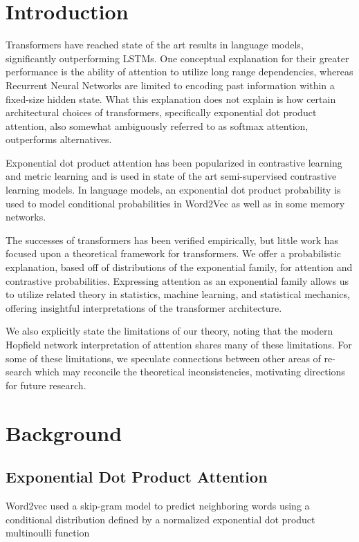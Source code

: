 \documentclass{article}
\begin{document}
\section{Introduction}
\label{introduction}

Transformers have reached state of the art results in language models, significantly outperforming LSTMs. One conceptual explanation for their greater performance is the ability of attention to utilize long range dependencies, whereas Recurrent Neural Networks are limited to encoding past information within a fixed-size hidden state. 
What this explanation does not explain is how certain architectural choices of transformers, specifically exponential dot product attention, also somewhat ambiguously referred to as softmax attention, outperforms alternatives.

Exponential dot product attention has been popularized in contrastive learning and metric learning and is used in state of the art semi-supervised contrastive learning models.
In language models, an exponential dot product probability is used to model conditional probabilities in Word2Vec as well as in some memory networks. 

The successes of transformers has been verified empirically, but little work
has focused upon a theoretical framework for transformers. 
We offer a probabilistic explanation, based off of distributions of the exponential
family, for attention and contrastive probabilities. 
Expressing attention as an exponential family allows us to utilize related theory in statistics, machine learning, and statistical mechanics, offering insightful interpretations of the transformer architecture.

We also explicitly state the limitations of our theory, noting that the modern
Hopfield network interpretation of attention shares many of these limitations. For
some of these limitations, we speculate connections between other areas of re-
search which may reconcile the theoretical inconsistencies, motivating directions
for future research.

\section{Background}
\label{background}

\subsection{Exponential Dot Product Attention}
Word2vec used a skip-gram model to predict neighboring words using a conditional distribution defined by a normalized exponential dot product multinoulli function \cite{DBLP:journals/corr/MikolovSCCD13}
\end{document}
